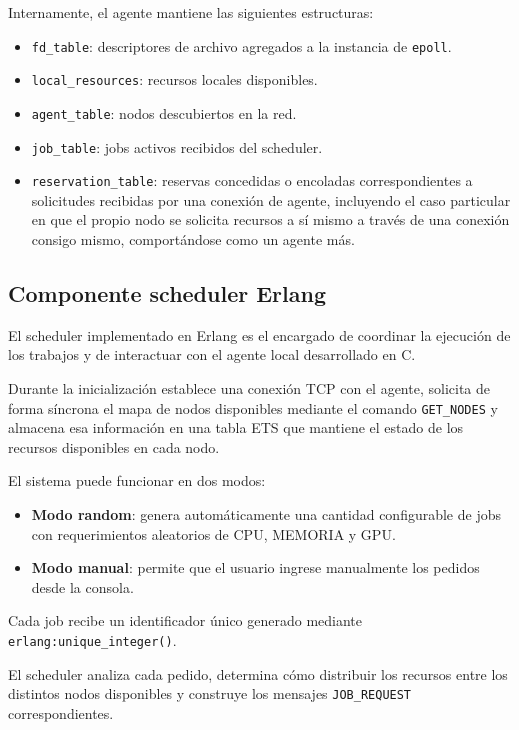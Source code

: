 \documentclass[a4paper,10pt]{article}
\begin{document}
\noindent Internamente, el agente mantiene las siguientes estructuras:
\begin{itemize}
    \item \texttt{fd\_table}: descriptores de archivo agregados a la instancia de \texttt{epoll}.
    \item \texttt{local\_resources}: recursos locales disponibles.
    \item \texttt{agent\_table}: nodos descubiertos en la red.
    \item \texttt{job\_table}: jobs activos recibidos del scheduler.
    \item \texttt{reservation\_table}: reservas concedidas o encoladas correspondientes a solicitudes recibidas por una conexión de agente, incluyendo el caso particular en que el propio nodo se solicita recursos a sí mismo a través de una conexión consigo mismo, comportándose como un agente más.
\end{itemize}

\subsection{Componente scheduler Erlang}

\noindent El scheduler implementado en Erlang es el encargado de coordinar la ejecución de los trabajos y de interactuar con el agente local desarrollado en C.

\noindent Durante la inicialización establece una conexión TCP con el agente, solicita de forma síncrona el mapa de nodos disponibles mediante el comando \texttt{GET\_NODES} y almacena esa información en una tabla ETS que mantiene el estado de los recursos disponibles en cada nodo.

\noindent El sistema puede funcionar en dos modos:

\begin{itemize}
    \item \textbf{Modo random}: genera automáticamente una cantidad configurable de jobs con requerimientos aleatorios de CPU, MEMORIA y GPU.
    \item \textbf{Modo manual}: permite que el usuario ingrese manualmente los pedidos desde la consola.
\end{itemize}

\noindent Cada job recibe un identificador único generado mediante \texttt{erlang:unique\_integer()}.

\noindent El scheduler analiza cada pedido, determina cómo distribuir los recursos entre los distintos nodos disponibles y construye los mensajes \texttt{JOB\_REQUEST} correspondientes.
\end{document}
